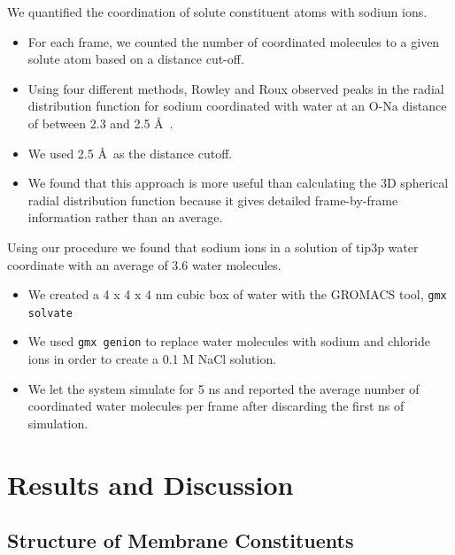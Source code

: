 \documentclass{article}
\begin{document}
  We quantified the coordination of solute constituent atoms with sodium ions.
  \begin{itemize}
  	\item For each frame, we counted the number of coordinated molecules to a
  	given solute atom based on a distance cut-off. 
  	\item Using four different methods, Rowley and Roux observed peaks in the
  	radial distribution function for sodium coordinated with water at an O-Na
  	distance of between 2.3 and 2.5 \AA~\cite{rowley_solvation_2012}. 
  	\item We used 2.5 \AA~as the distance cutoff.
  	\item We found that this approach is more useful than calculating the
	3D spherical radial distribution function because it gives detailed
	frame-by-frame information rather than an average. 
  \end{itemize}
  
  Using our procedure we found that sodium ions in a solution of tip3p water
  coordinate with an average of 3.6 water molecules.
  \begin{itemize}
    \item We created a 4 x 4 x 4 nm cubic box of water with the GROMACS tool,
    \texttt{gmx solvate}
    \item We used \texttt{gmx genion} to replace water molecules with sodium
    and chloride ions in order to create a 0.1 M NaCl solution.
    \item We let the system simulate for 5 ns and reported the average
    number of coordinated water molecules per frame after discarding the first ns of 
    simulation. %
  \end{itemize}
   
  \section{Results and Discussion}
  
  \subsection*{Structure of Membrane Constituents}\label{section:membrane_components}
  
\end{document}
